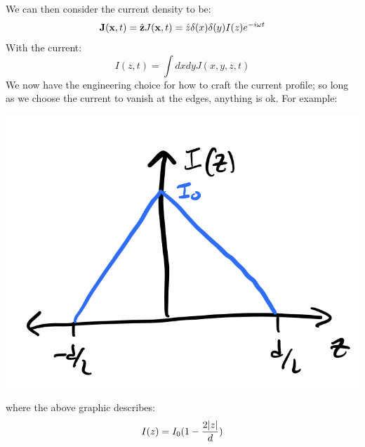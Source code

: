 We can then consider the current density to be:
\begin{equation}
    \mathbf{J}(\mathbf{x}, t) = \hat{\mathbf{z}}J(\mathbf{x}, t) = \hat{z}\delta(x)\delta(y)I(z)e^{-i\omega t}
\end{equation}
With the current:
\begin{equation}
    I(z, t) = \int dxdy J(x, y, z, t)
\end{equation}
We now have the engineering choice for how to craft the current profile; so long as we choose the current to vanish at the edges, anything is ok. For example:

\begin{center}
    \includegraphics[scale=0.35]{Lectures/Images/lec11-antennacurrent.png}
\end{center}

where the above graphic describes:
\begin{equation}
    I(z) = I_0(1 - \frac{2\lvert z \rvert}{d})
\end{equation}

